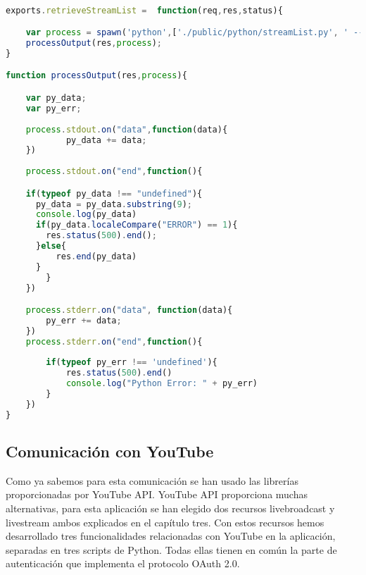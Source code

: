 \begin{lstlisting}[language = JavaScript] 

exports.retrieveStreamList =  function(req,res,status){

    var process = spawn('python',['./public/python/streamList.py', ' --status' , status]);
    processOutput(res,process);
}

function processOutput(res,process){

    var py_data;
    var py_err;
    
    process.stdout.on("data",function(data){
            py_data += data; 
    })
    
    process.stdout.on("end",function(){

    if(typeof py_data !== "undefined"){
      py_data = py_data.substring(9);
      console.log(py_data)
      if(py_data.localeCompare("ERROR") == 1){
        res.status(500).end();
      }else{
          res.end(py_data)
      }
        }   
    })

    process.stderr.on("data", function(data){
        py_err += data;
    })
    process.stderr.on("end",function(){
    
        if(typeof py_err !== 'undefined'){
            res.status(500).end()
            console.log("Python Error: " + py_err)
        }   
    })
}

\end{lstlisting}

\subsection{Comunicación con YouTube}

Como ya sabemos para esta comunicación se han usado las librerías proporcionadas por YouTube API. YouTube API proporciona muchas alternativas, para esta aplicación se han elegido dos recursos livebroadcast y livestream ambos explicados en el capítulo tres. Con estos recursos hemos desarrollado tres funcionalidades relacionadas con YouTube en la aplicación, separadas en tres scripts de Python. Todas ellas tienen en común la parte de autenticación que implementa  el protocolo OAuth 2.0.

\\

